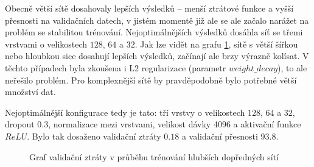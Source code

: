 Obecně větší sítě dosahovaly lepších výsledků – menší ztrátové funkce a vyšší
přesnosti na validačních datech, v jistém momentě již ale se ale začalo narážet
na problém se stabilitou trénování. Nejoptimálnějších výsledků dosáhla síť se
třemi vrstvami o velikostech $128$, $64$ a $32$. Jak lze vidět na grafu
\ref{graph:deepffnn}, sítě s větší šířkou nebo hloubkou sice dosahují lepších
výsledků, začínají ale brzy výrazně kolísat. V těchto případech byla zkoušena i
L2 regularizace (parametr $weight\_decay$), to ale neřešilo problém. Pro
komplexnější sítě by pravděpodobně bylo potřebné větší množství dat.

Nejoptimálnější konfigurace tedy je tato: tří vrstvy o velikostech $128$, $64$
a $32$, dropout $0.3$, normalizace mezi vrstvami, velikost dávky 4096 a
aktivační funkce $ReLU$. Bylo tak dosaženo validační ztráty $0.18$ a validační
přesnosti 93.8.%

\begin{figure}[]
    \centering
    \caption{Graf validační ztráty v průběhu trénování hlubších dopředných sítí }
    \label{graph:deepffnn}
\end{figure}

